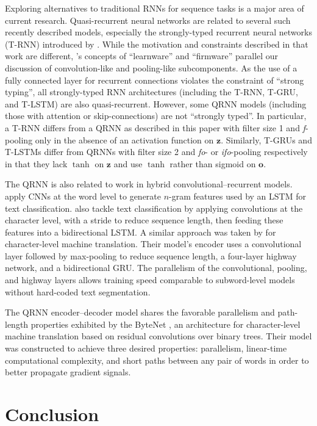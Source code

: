 \documentclass{article} %
\begin{document}
Exploring alternatives to traditional RNNs for sequence tasks is a major area of current research. Quasi-recurrent neural networks are related to several such recently described models, especially the strongly-typed recurrent neural networks (T-RNN) introduced by \cite{Balduzzi2016}. While the motivation and constraints described in that work are different, \cite{Balduzzi2016}'s concepts of ``learnware'' and ``firmware'' parallel our discussion of convolution-like and pooling-like subcomponents. As the use of a fully connected layer for recurrent connections violates the constraint of ``strong typing'', all strongly-typed RNN architectures (including the T-RNN, T-GRU, and T-LSTM) are also quasi-recurrent. However, some QRNN models (including those with attention or skip-connections) are not ``strongly typed''. In particular, a T-RNN differs from a QRNN as described in this paper with filter size 1 and \emph{f}-pooling only in the absence of an activation function on $\mathbf{z}$. Similarly, T-GRUs and T-LSTMs differ from QRNNs with filter size 2 and \emph{fo}- or \emph{ifo}-pooling respectively in that they lack $\tanh$ on $\mathbf{z}$ and use $\tanh$ rather than sigmoid on $\mathbf{o}$.

The QRNN is also related to work in hybrid convolutional--recurrent models. \citet{Zhou2015b} apply CNNs at the word level to generate $n$-gram features used by an LSTM for text classification. \citet{Xiao2016} also tackle text classification by applying convolutions at the character level, with a stride to reduce sequence length, then feeding these features into a bidirectional LSTM. A similar approach was taken by \citet{Lee2016} for character-level machine translation. Their model's encoder uses a convolutional layer followed by max-pooling to reduce sequence length, a four-layer highway network, and a bidirectional GRU.
The parallelism of the convolutional, pooling, and highway layers allows training speed comparable to subword-level models without hard-coded text segmentation.

The QRNN encoder--decoder model shares the favorable parallelism and path-length properties exhibited by the ByteNet \citep{Kalchbrenner2016}, an architecture for character-level machine translation based on residual convolutions over binary trees. Their model was constructed to achieve three desired properties: parallelism, linear-time computational complexity, and short paths between any pair of words in order to better propagate gradient signals.

\section{Conclusion}
\end{document}
